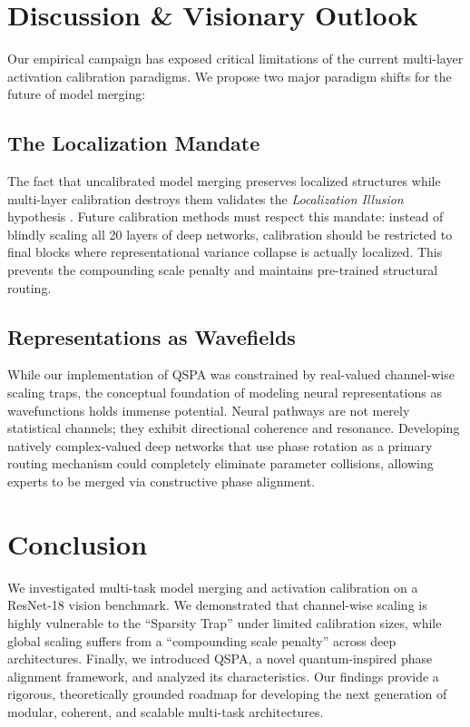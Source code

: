 \documentclass{article}
\begin{document}
\section{Discussion \& Visionary Outlook}
Our empirical campaign has exposed critical limitations of the current multi-layer activation calibration paradigms. We propose two major paradigm shifts for the future of model merging:

\subsection{The Localization Mandate}
The fact that uncalibrated model merging preserves localized structures while multi-layer calibration destroys them validates the \textit{Localization Illusion} hypothesis \cite{submission3}. Future calibration methods must respect this mandate: instead of blindly scaling all 20 layers of deep networks, calibration should be restricted to final blocks where representational variance collapse is actually localized. This prevents the compounding scale penalty and maintains pre-trained structural routing.

\subsection{Representations as Wavefields}
While our implementation of QSPA was constrained by real-valued channel-wise scaling traps, the conceptual foundation of modeling neural representations as wavefunctions holds immense potential. Neural pathways are not merely statistical channels; they exhibit directional coherence and resonance. Developing natively complex-valued deep networks that use phase rotation as a primary routing mechanism could completely eliminate parameter collisions, allowing experts to be merged via constructive phase alignment.

\section{Conclusion}
We investigated multi-task model merging and activation calibration on a ResNet-18 vision benchmark. We demonstrated that channel-wise scaling is highly vulnerable to the ``Sparsity Trap'' under limited calibration sizes, while global scaling suffers from a ``compounding scale penalty'' across deep architectures. Finally, we introduced QSPA, a novel quantum-inspired phase alignment framework, and analyzed its characteristics. Our findings provide a rigorous, theoretically grounded roadmap for developing the next generation of modular, coherent, and scalable multi-task architectures.
\end{document}
